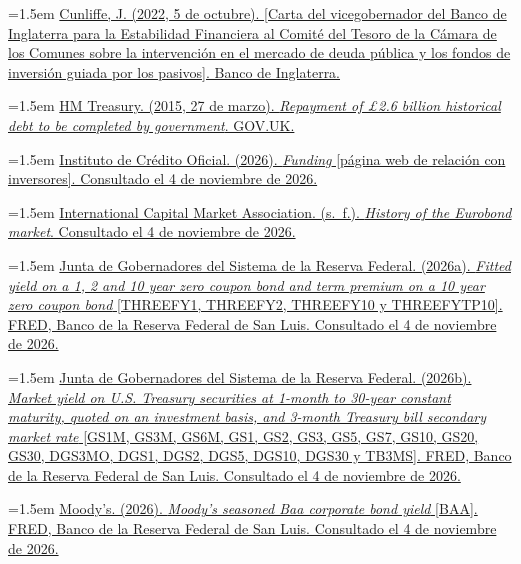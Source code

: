 \documentclass[10pt,a4paper]{article}
\begin{document}
\noindent\hangindent=1.5em \href{https://www.bankofengland.co.uk/-/media/boe/files/letter/2022/october/letter-from-jon-cunliffe-ldi-5-october-2022}{Cunliffe, J. (2022, 5 de octubre). [Carta del vicegobernador del Banco de Inglaterra para la Estabilidad Financiera al Comité del Tesoro de la Cámara de los Comunes sobre la intervención en el mercado de deuda pública y los fondos de inversión guiada por los pasivos]. Banco de Inglaterra.}

\noindent\hangindent=1.5em \href{https://www.gov.uk/government/news/repayment-of-26-billion-historical-debt-to-be-completed-by-government}{HM Treasury. (2015, 27 de marzo). \textit{Repayment of \pounds2.6 billion historical debt to be completed by government}. GOV.UK.}

\noindent\hangindent=1.5em \href{https://www.ico.es/web/ico_en/ico/investor_relations/funding}{Instituto de Crédito Oficial. (2026). \textit{Funding} [página web de relación con inversores]. Consultado el 4 de noviembre de 2026.}

\noindent\hangindent=1.5em \href{https://www.icmagroup.org/about-icma/history/history-of-the-eurobond-market/}{International Capital Market Association. (s.~f.). \textit{History of the Eurobond market}. Consultado el 4 de noviembre de 2026.}

\noindent\hangindent=1.5em \href{https://fred.stlouisfed.org/series/THREEFYTP10}{Junta de Gobernadores del Sistema de la Reserva Federal. (2026a). \textit{Fitted yield on a 1, 2 and 10 year zero coupon bond and term premium on a 10 year zero coupon bond} [THREEFY1, THREEFY2, THREEFY10 y THREEFYTP10]. FRED, Banco de la Reserva Federal de San Luis. Consultado el 4 de noviembre de 2026.}

\noindent\hangindent=1.5em \href{https://fred.stlouisfed.org/categories/115}{Junta de Gobernadores del Sistema de la Reserva Federal. (2026b). \textit{Market yield on U.S. Treasury securities at 1-month to 30-year constant maturity, quoted on an investment basis, and 3-month Treasury bill secondary market rate} [GS1M, GS3M, GS6M, GS1, GS2, GS3, GS5, GS7, GS10, GS20, GS30, DGS3MO, DGS1, DGS2, DGS5, DGS10, DGS30 y TB3MS]. FRED, Banco de la Reserva Federal de San Luis. Consultado el 4 de noviembre de 2026.}

\noindent\hangindent=1.5em \href{https://fred.stlouisfed.org/series/BAA}{Moody's. (2026). \textit{Moody's seasoned Baa corporate bond yield} [BAA]. FRED, Banco de la Reserva Federal de San Luis. Consultado el 4 de noviembre de 2026.}
\end{document}

